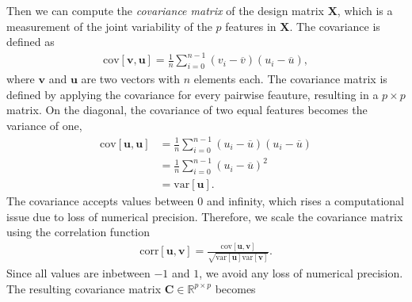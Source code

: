 Then we can compute the \textit{covariance matrix} of the design matrix $\boldsymbol{X}$, which is a measurement of the joint variability of the $p$ features in $\boldsymbol{X}$. The covariance is defined as
\begin{align}
\mathrm{cov}[\boldsymbol{v},\boldsymbol{u}] =\frac{1}{n} \sum_{i=0}^{n-1}(v_i- \overline{v})(u_i- \overline{u}),
\end{align}
where $\boldsymbol{v}$ and $\boldsymbol{u}$ are two vectors with $n$ elements each. The covariance matrix is defined by applying the covariance for every pairwise feauture, resulting in a $p\times p$ matrix. On the diagonal, the covariance of two equal features becomes the variance of one,
\begin{align}
  \mathrm{cov}[\boldsymbol{u},\boldsymbol{u}] &=\frac{1}{n} \sum_{i=0}^{n-1}(u_i- \overline{u})(u_i- \overline{u}) \\
  &=\frac{1}{n} \sum_{i=0}^{n-1}(u_i- \overline{u})^2\\
  &=\mathrm{var}[\boldsymbol{u}].
\end{align}
The covariance accepts values between $0$ and infinity, which rises a computational issue due to loss of numerical precision. Therefore, we scale the covariance matrix using the correlation function
\begin{align}
  \mathrm{corr}[\boldsymbol{u},\boldsymbol{v}]=\frac{\mathrm{cov}[\boldsymbol{u},\boldsymbol{v}]}{\sqrt{\mathrm{var}[\boldsymbol{u}] \mathrm{var}[\boldsymbol{v}]}}.
\end{align}
Since all values are inbetween $-1$ and $1$, we avoid any loss of numerical precision. The resulting covariance matrix $\boldsymbol{C} \in {\mathbb{R}}^{p\times p}$ becomes

